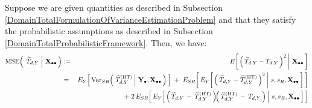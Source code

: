 \vskip 0.1cm
\begin{lemma}
\label{DecompositionMSETtilde}
\mbox{}
\vskip 0.1cm
\noindent
Suppose we are given quantities as described in Subsection
\ref{DomainTotalFormulationOfVarianceEstimationProblem}
and
that they satisfy the probabilistic assumptions as described in Subsection
\ref{DomainTotalProbabilisticFramework}.
\vskip 0.1cm
\noindent
Then, we have:
\begin{eqnarray*}
\MSE\!\left(\;
    \left.
    \widetilde{T}_{d,Y}
    \;\right\vert\,
    \Xobs
    \,\right)
& := &
    E\!\left[
        \left.
        \left(\,\widetilde{T}_{d,Y} - T_{d,Y}\,\right)^{2}
        \,\right\vert\,
        \Xobs
        \,\right]
\\
& = &
    E_{Y}\!\left[\,
    \Var_{SR}\!\left(\,
        \left.
        \widehat{T}^{\textnormal{(HT)}}_{d,Y}
        \,\right\vert\,
        \Ydot,
        \Xobs
        \,\right)
        \,\right]
    \;+\;
    E_{SR}\!\left[\,
    E_{Y}\!\left[
        \left.
        \left(\,\widetilde{T}_{d,Y} - \widehat{T}^{\textnormal{(HT)}}_{d,Y}\,\right)^{2}
        \,\right\vert\,
        s,s_{R},\Xobs
        \,\right]
        \,\right]
\\
&&
    +\;2\,
    E_{SR}\!\left[\,
    E_{Y}\!\left[
        \left.
        \left(\,\widetilde{T}_{d,Y} \,-\, \widehat{T}^{\textnormal{(HT)}}_{d,Y}\,\right)
        \!\!
        \left(\,\widehat{T}^{\textnormal{(HT)}}_{d,Y} \,-\, T_{d,Y}\,\right)
        \,\right\vert\,
        s,s_{R},\Xobs
        \,\right]
        \,\right]
\end{eqnarray*}
\end{lemma}
\proof
